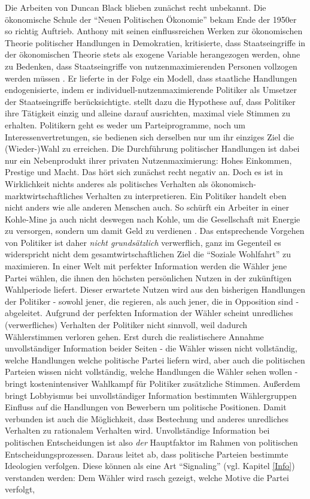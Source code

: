 Die Arbeiten von Duncan Black blieben zunächst recht unbekannt. Die ökonomische Schule der "`Neuen Politischen Ökonomie"' bekam Ende der 1950er so richtig Auftrieb. Anthony \textcite{Downs1957b, Downs1957} mit seinen einflussreichen Werken zur ökonomischen Theorie politischer Handlungen in Demokratien, kritisierte, dass Staatseingriffe in der ökonomischen Theorie stets als exogene Variable herangezogen werden, ohne zu Bedenken, dass Staatseingriffe von nutzenmaximierenden Personen vollzogen werden müssen \parencite[S. 135]{Downs1957}. Er lieferte in der Folge ein Modell, dass staatliche Handlungen endogenisierte, indem er individuell-nutzenmaximierende Politiker als Umsetzer der Staatseingriffe berücksichtigte. \textcite[S. 137]{Downs1957} stellt dazu die Hypothese auf, dass Politiker ihre Tätigkeit einzig und alleine darauf ausrichten, maximal viele Stimmen zu erhalten. Politikern geht es weder um Parteiprogramme, noch um Interessenvertretungen, sie bedienen sich derselben nur um ihr einziges Ziel die (Wieder-)Wahl zu erreichen. Die Durchführung politischer Handlungen ist dabei nur ein Nebenprodukt ihrer privaten Nutzenmaximierung: Hohes Einkommen, Prestige und Macht. Das hört sich zunächst recht negativ an. Doch es ist in Wirklichkeit nichts anderes als politisches Verhalten als ökonomisch-marktwirtschaftliches Verhalten zu interpretieren. Ein Politiker handelt eben nicht anders wie alle anderen Menschen auch. So schürft ein Arbeiter in einer Kohle-Mine ja auch nicht deswegen nach Kohle, um die Gesellschaft mit Energie zu versorgen, sondern um damit Geld zu verdienen \parencite[S. 137]{Downs1957}. Das entsprechende Vorgehen von Politiker ist daher \textit{nicht grundsätzlich} verwerflich, ganz im Gegenteil es widerspricht nicht dem gesamtwirtschaftlichen Ziel die "`Soziale Wohlfahrt"' zu maximieren. In einer Welt mit perfekter Information werden die Wähler jene Partei wählen, die ihnen den höchsten persönlichen Nutzen in der zukünftigen Wahlperiode liefert. Dieser erwartete Nutzen wird aus den bisherigen Handlungen der Politiker - sowohl jener, die regieren, als auch jener, die in Opposition sind - abgeleitet. Aufgrund der perfekten Information der Wähler scheint unredliches (verwerfliches) Verhalten der Politiker nicht sinnvoll, weil dadurch Wählerstimmen verloren gehen. Erst durch die realistischere Annahme unvollständiger Information beider Seiten - die Wähler wissen nicht vollständig, welche Handlungen welche politische Partei liefern wird, aber auch die politischen Parteien wissen nicht vollständig, welche Handlungen die Wähler sehen wollen - bringt kostenintensiver Wahlkampf für Politiker zusätzliche Stimmen. Außerdem bringt Lobbyismus bei unvollständiger Information bestimmten Wählergruppen Einfluss auf die Handlungen von Bewerbern um politische Positionen. Damit verbunden ist auch die Möglichkeit, dass Bestechung und anderes unredliches Verhalten zu rationalem Verhalten wird. Unvollständige Information bei politischen Entscheidungen ist also \textit{der} Hauptfaktor im Rahmen von politischen Entscheidungsprozessen. Daraus leitet \textcite[S. 141]{Downs1957} ab, dass politische Parteien bestimmte Ideologien verfolgen. Diese können als eine Art "`Signaling"' (vgl. Kapitel \ref{Info}) verstanden werden: Dem Wähler wird rasch gezeigt, welche Motive die Partei verfolgt, 
